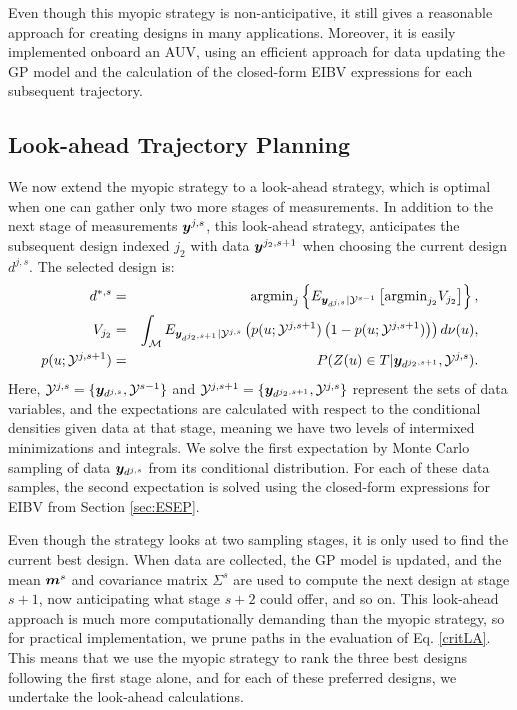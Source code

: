 \documentclass[aoas]{imsart}
\begin{document}
Even though this myopic strategy is non-anticipative, it still gives a
reasonable approach for creating designs in many
applications. Moreover, it is easily implemented onboard an AUV,
using an efficient approach for data updating the GP model and the
calculation of the closed-form EIBV expressions for each
subsequent trajectory.


\subsection{Look-ahead Trajectory Planning}
\label{sec:LA}

We now extend the myopic strategy to a look-ahead strategy, which is
optimal when one can gather only two more stages of measurements. In
addition to the next stage of measurements ${\boldsymbol y}^{j,s}$, this
look-ahead strategy, anticipates the subsequent design indexed $j_2$ with
data ${\boldsymbol y}^{j_2,s+1}$ when choosing the current design $d^{j,s}$.  The
selected design is:
\begin{eqnarray}\label{critLA}
    d^{*,s} &=& \mbox{argmin}_{j} \left\{ E_{\by_{d^{j,s}}|\mathcal{Y}^{s-1}} \left[ \mbox{argmin}_{j_2}  V_{j_2} \right] \right\}, \\
V_{j_2} & = & \int_{\mathcal{M}} E_{\by_{d^{j_2,s+1}}|\mathcal{Y}^{j,s}} \left( p(\x;\mathcal{Y}^{j,s+1})\left( 1-p(\x;\mathcal{Y}^{j,s+1})\right) \right) d\mes(u), \nonumber \\
    p(\x;\mathcal{Y}^{j,s+1}) &=& P(Z(\x) \in T |\by_{d^{j_2,s+1}},\mathcal{Y}^{j,s}). \nonumber
\end{eqnarray}
Here, $\mathcal{Y}^{j,s}=\{{\boldsymbol y}_{d^{j,s}},\mathcal{Y}^{s-1}\}$ and
$\mathcal{Y}^{j,s+1}=\{{\boldsymbol y}_{d^{j_2,s+1}},\mathcal{Y}^{j,s}\}$ represent
the sets of data variables, and the expectations are calculated with respect to
the conditional densities given data at that stage, meaning we have two levels of intermixed minimizations and integrals.
We solve the
first expectation by Monte Carlo sampling of data ${\boldsymbol y}_{d^{j,s}}$ from its
conditional distribution. For each of these data samples, the second expectation
is solved using the closed-form expressions for EIBV from
Section \ref{sec:ESEP}.

Even though the strategy looks at two sampling stages, it is only used to find
the current best design. When data are collected, the GP model is
updated, and the mean ${\boldsymbol m}^{s}$ and covariance matrix $\Sigma^{s}$ are
used to compute the next design at stage $s+1$, now anticipating what
stage $s+2$ could offer, and so on.
This look-ahead approach is much more computationally demanding than
the myopic strategy, so for practical implementation, we prune paths
in the evaluation of Eq. \eqref{critLA}. This means that we use the myopic
strategy to rank the three best designs following the first stage alone, and
for each of these preferred designs, we undertake the look-ahead calculations.
\end{document}
